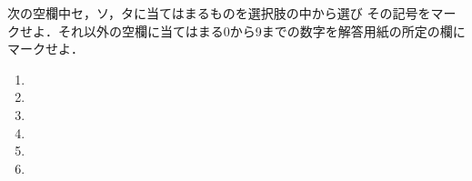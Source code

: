 \documentclass[../../../uem_mei_q.tex]{subfiles}
\begin{document}
    次の空欄中\textsf{セ}，\textsf{ソ}，\textsf{タ}に当てはまるものを選択肢の中から選び%
    その記号をマークせよ．それ以外の空欄に当てはまる0から9までの数字を解答用紙の所定の欄に%
    マークせよ．
    
    \begin{enumerate}
        \item 
        \item 
        \item 
        \item 
        \item 
        \item 
    \end{enumerate}
\end{document}
